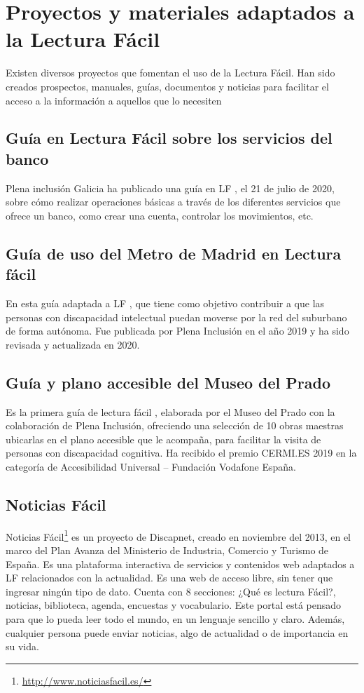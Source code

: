 \section{Proyectos y materiales adaptados a la Lectura Fácil}

Existen diversos proyectos que fomentan el uso de la Lectura Fácil. Han sido creados prospectos, manuales, guías, documentos y noticias para facilitar el acceso a la información a aquellos que lo necesiten 


\subsection{Guía en Lectura Fácil sobre los servicios del banco}



Plena inclusión Galicia ha publicado una guía en LF \citep{GuiaBanco}, el 21 de julio de 2020, sobre cómo realizar operaciones básicas a través de los diferentes servicios que ofrece un banco, como crear una cuenta, controlar los movimientos, etc.

\subsection{Guía de uso del Metro de Madrid en Lectura fácil}


En esta guía adaptada a LF \citep{GuiaMetro}, que tiene como objetivo contribuir a que las personas con discapacidad intelectual puedan moverse por la red del suburbano de forma autónoma. Fue publicada por Plena Inclusión en el año 2019 y ha sido revisada y actualizada en 2020. 

\subsection{Guía y plano accesible del Museo del Prado} 
Es la primera guía  de lectura fácil \citep{GuiaMuseo}, elaborada por el Museo del Prado con la colaboración de Plena Inclusión, ofreciendo una selección de 10 obras maestras ubicarlas en el plano accesible \citep{plano} que le acompaña, para facilitar la visita de personas con discapacidad cognitiva. Ha recibido el premio CERMI.ES 2019 en la categoría de Accesibilidad Universal – Fundación Vodafone España.

\subsection{{Noticias Fácil} }
Noticias Fácil\footnote{\href{http://www.noticiasfacil.es/}{http://www.noticiasfacil.es/}} es un proyecto de Discapnet, creado en noviembre del 2013, en el marco del Plan Avanza del Ministerio de Industria, Comercio y Turismo de España. Es una plataforma interactiva de servicios y contenidos web adaptados a LF relacionados con la actualidad. Es una web de acceso libre, sin tener que ingresar ningún tipo de dato. Cuenta con 8 secciones: ¿Qué es lectura Fácil?, noticias, biblioteca, agenda, encuestas y vocabulario. Este portal está pensado para que lo pueda leer todo el mundo, en un lenguaje sencillo y claro. Además, cualquier persona puede enviar noticias, algo de actualidad o de importancia en su vida.

